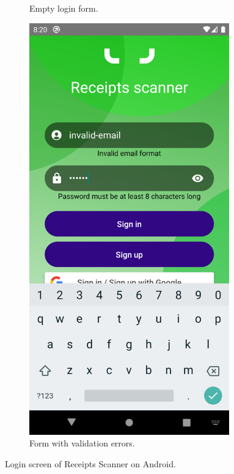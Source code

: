 \documentclass[
  digital, %
  table,   %
  oneside, %
  lof,     %
  lot,     %
]{fithesis3}
\newcommand\half{0.45}
\newcommand\subfigsize{0.95}
\begin{document}
\begin{enumerate}
\begin{figure}[H]
\begin{subfigure}[t]{\half\textwidth}
          \caption{Empty login form.}
        \end{subfigure}
        \begin{subfigure}[t]{\half\textwidth}
          \centering
          \includegraphics[width=\subfigsize\textwidth]{figures/screens/android/light/login_validation}
          \caption{Form with validation \mbox{errors}.}
          \label{fig:login_validation}
        \end{subfigure}
        \caption{Login screen of Receipts Scanner on Android.}
        \label{fig:login_screen}
    \end{figure}
    

\end{enumerate}
\end{document}

